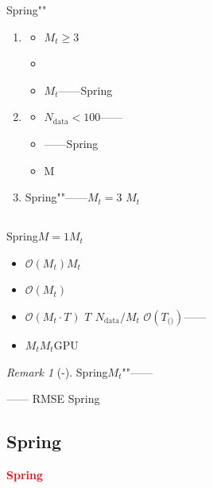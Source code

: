 \documentclass[12pt,a4paper]{article}
\theoremstyle{remark}
\newtheorem{remark}[theorem]{Remark}
\newcommand{\honestcrit}[1]{%
    \textcolor{red}{\textbf{#1}}%
}
\begin{document}
Spring""

\begin{enumerate}[label=(\arabic*),itemsep=3pt]
    \item \textbf{}
    \begin{itemize}[nosep]
        \item $M_t \geq 3$
        \item 
        \item $M_t$——Spring
    \end{itemize}

    \item \textbf{}
    \begin{itemize}[nosep]
        \item $N_{\text{data}} < 100$——
        \item ——Spring
        \item M
    \end{itemize}

    \item \textbf{} 
    Spring""——$M_t = 3$
    $M_t$
\end{enumerate}

\subsection{}

Spring$M=1$$M_t$


\begin{itemize}[itemsep=3pt]
    \item \textbf{} $\mathcal{O}(M_t)$$M_t$
    \item \textbf{} $\mathcal{O}(M_t)$
    \item \textbf{} $\mathcal{O}(M_t \cdot T_{\text{}})$
    $T_{\text{}}$
    $N_{\text{data}}/M_t$
    $\mathcal{O}(T_{\text{()}})$——
    \item \textbf{} $M_t$$M_t$GPU
    
\end{itemize}

\begin{remark}[-]
Spring$M_t$""\textbf{}——

——
RMSE
Spring\textit{}

\end{remark}

\subsection{Spring}

\honestcrit{Spring}
\end{document}
